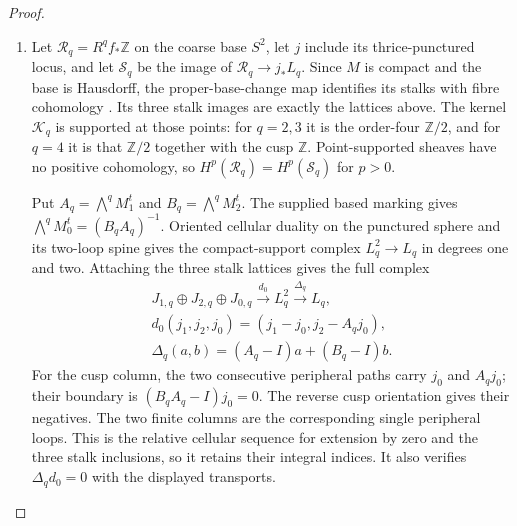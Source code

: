 \begin{proof}
\begin{enumerate}[label=\arabic*.]
\item Let $\mathcal R_q=R^qf_*\mathbb Z$ on the coarse base $S^2$,
let $j$ include its thrice-punctured locus, and let $\mathcal S_q$
be the image of $\mathcal R_q\to j_*L_q$.
Since $M$ is compact and the base is Hausdorff, the proper-base-change
map identifies its stalks with fibre cohomology
\cite[Tag 09V5, Lemma 20.18.1; chapter PDF p.~30]{StacksProject}.
Its three stalk images are exactly the lattices above.  The kernel
$\mathcal K_q$ is supported at those points: for $q=2,3$ it is the
order-four $\mathbb Z/2$, and for $q=4$ it is that $\mathbb Z/2$
together with the cusp $\mathbb Z$.
Point-supported sheaves have no positive cohomology, so
$H^p(\mathcal R_q)=H^p(\mathcal S_q)$ for $p>0$.

Put $A_q=\bigwedge^qM_1^t$ and $B_q=\bigwedge^qM_2^t$.
The supplied based marking gives
$\bigwedge^qM_0^t=(B_qA_q)^{-1}$.
Oriented cellular duality on the punctured sphere and its two-loop
spine gives the compact-support complex $L_q^2\to L_q$ in degrees
one and two.  Attaching the three stalk lattices gives the full complex
\[
\begin{gathered}
 J_{1,q}\oplus J_{2,q}\oplus J_{0,q}
 \xrightarrow{d_0}L_q^2\xrightarrow{\Delta_q}L_q,\\
 d_0(j_1,j_2,j_0)=(j_1-j_0,j_2-A_qj_0),\\
 \Delta_q(a,b)=(A_q-I)a+(B_q-I)b.
\end{gathered}
\]
For the cusp column, the two consecutive peripheral paths carry
$j_0$ and $A_qj_0$; their boundary is
$(B_qA_q-I)j_0=0$.  The reverse cusp orientation gives their negatives.
The two finite columns are the corresponding single peripheral
loops.  This is the relative cellular sequence for extension by zero
and the three stalk inclusions, so it retains their integral indices.
It also verifies $\Delta_qd_0=0$ with the displayed transports.


\end{enumerate}
\end{proof}
